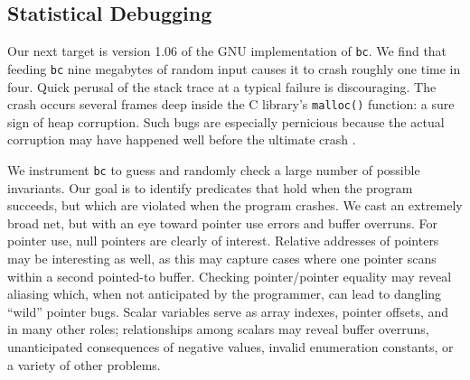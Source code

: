 \subsection{Statistical Debugging}
\label{sec:debug}


Our next target is version 1.06 of the GNU implementation of
\texttt{bc}.  We find that feeding \texttt{bc} nine megabytes of
random input causes it to crash roughly one time in four.
Quick perusal of the stack trace at a typical failure is discouraging.
The crash occurs several frames deep inside the C library's
\texttt{malloc()} function: a sure sign of heap corruption.  Such bugs
are especially pernicious because the actual corruption may have
happened well before the ultimate crash \cite{Eisenstadt1993b}.

We instrument \texttt{bc} to guess and randomly check a large number
of possible invariants.  Our goal is to identify predicates that hold
when the program succeeds, but which are violated when the program
crashes.  We cast an extremely broad net, but with an eye toward
pointer use errors and buffer overruns.  For pointer use, null
pointers are clearly of interest.  Relative addresses of pointers may
be interesting as well, as this may capture cases where one pointer
scans within a second pointed-to buffer.  Checking pointer/pointer
equality may reveal aliasing which, when not anticipated by the
programmer, can lead to dangling ``wild'' pointer bugs.  Scalar
variables serve as array indexes, pointer offsets, and in many other
roles; relationships among scalars may reveal buffer overruns,
unanticipated consequences of negative values, invalid enumeration
constants, or a variety of other problems.

